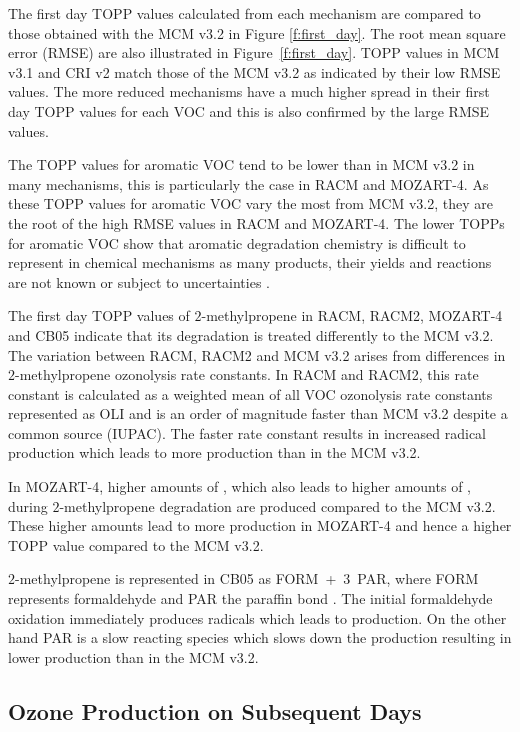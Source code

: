 The first day TOPP values calculated from each mechanism are compared to those obtained with the MCM v3.{2} in Figure \ref{f:first_day}. 
The root mean square error (RMSE) are also illustrated in \mbox{Figure \ref{f:first_day}}.
TOPP values in MCM v3.1 and CRI v2 match those of the MCM v3.2 as indicated by their low RMSE values.
The more reduced mechanisms have a much higher spread in their first day TOPP values for each VOC and this is also confirmed by the large RMSE values.

The TOPP values for aromatic VOC tend to be lower than in MCM v3.2 in many mechanisms, this is particularly the case in RACM and  MOZART-4.
As these TOPP values for aromatic VOC vary the most from MCM v3.2, they are the root of the high RMSE values in RACM and  MOZART-4.
The lower TOPPs for aromatic VOC show that aromatic degradation chemistry is difficult to represent in chemical mechanisms as many products, their yields and reactions are not known or subject to uncertainties \citep{Vereecken:2012}.

The first day TOPP values of $2$-methylpropene in RACM, RACM2, MOZART-4 and CB05 indicate that its degradation is treated differently to the MCM v3.2. 
The variation between RACM, RACM2 and MCM v3.2 arises from differences in $2$-methylpropene ozonolysis rate constants.
In RACM and RACM2, this rate constant is calculated as a weighted mean of all VOC ozonolysis rate constants represented as OLI \citep{Stockwell:1997, Goliff:2013} and is an order of magnitude faster than MCM v3.2 despite a common source (IUPAC).
The faster rate constant results in increased radical production which leads to more  production than in the MCM v3.2.

In MOZART-4, higher amounts of , which also leads to higher amounts of , during $2$-methylpropene degradation are produced compared to the MCM v3.2.
These higher  amounts lead to more  production in MOZART-4 and hence a higher TOPP value compared to the MCM v3.2.

$2$-methylpropene is represented in CB05 as \mbox{FORM + $3$ PAR}, where FORM represents formaldehyde and PAR the paraffin  bond \citep{Yarwood:2005}. 
The initial formaldehyde oxidation immediately produces radicals which leads to  production.
On the other hand PAR is a slow reacting species which slows down the  production resulting in lower  production than in the MCM v3.2.

\subsection{Ozone Production on Subsequent Days} \label{ss:profiles} %

